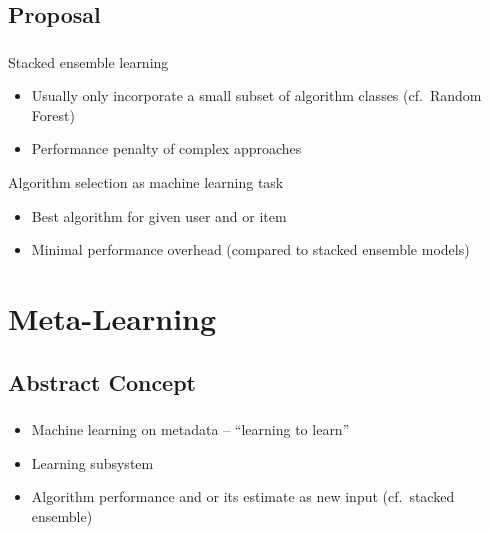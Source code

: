 \documentclass[aspectratio=169]{beamer}
\begin{document}
\subsection{Proposal}
\begin{frame}
	\frametitle{\insertsection}
	\framesubtitle{\insertsubsection}

	\begin{itemize}
		\item Stacked ensemble learning
		\begin{itemize}
			\item Usually only incorporate a small subset of algorithm classes (cf.\ Random Forest)
			\item Performance penalty of complex approaches
		\end{itemize}
		{
			\item Algorithm selection as machine learning task
		}
		\begin{itemize}
			\item Best algorithm for given user and or item
			\item Minimal performance overhead (compared to stacked ensemble models)
		\end{itemize}
	\end{itemize}
\end{frame}

\section[Methodology]{Meta-Learning}
\frame{\vfill\centering\tableofcontents[sectionstyle=show/shaded,subsectionstyle=show/hide]\vfill}

\subsection{Abstract Concept}
\begin{frame}
	\frametitle{\insertsection}
	\framesubtitle{\insertsubsection}

	\begin{itemize}
		\item Machine learning on metadata -- ``learning to learn''
		\item Learning subsystem
		\item Algorithm performance and or its estimate as new input (cf.\ stacked ensemble)
	\end{itemize}
\end{frame}
\end{document}
